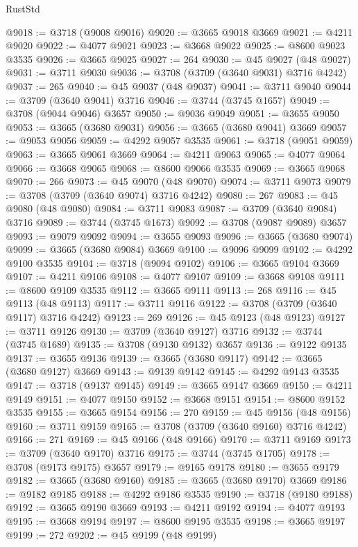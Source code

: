 \begin{lexlean}{RustStd}
\begin{coremodule}
@9018 := @3718 (@9008 @9016)
@9020 := @3665 @9018 @3669
@9021 := @4211 @9020
@9022 := @4077 @9021
@9023 := @3668 @9022
@9025 := @8600 @9023 @3535
@9026 := @3665 @9025
@9027 := 264
@9030 := @45 @9027 (@48 @9027)
@9031 := @3711 @9030
@9036 := @3708 (@3709 (@3640 @9031) @3716 @4242)
@9037 := 265
@9040 := @45 @9037 (@48 @9037)
@9041 := @3711 @9040
@9044 := @3709 (@3640 @9041) @3716
@9046 := @3744 (@3745 @1657)
@9049 := @3708 (@9044 @9046) @3657
@9050 := @9036 @9049
@9051 := @3655 @9050
@9053 := @3665 (@3680 @9031)
@9056 := @3665 (@3680 @9041) @3669
@9057 := @9053 @9056
@9059 := @4292 @9057 @3535
@9061 := @3718 (@9051 @9059)
@9063 := @3665 @9061 @3669
@9064 := @4211 @9063
@9065 := @4077 @9064
@9066 := @3668 @9065
@9068 := @8600 @9066 @3535
@9069 := @3665 @9068
@9070 := 266
@9073 := @45 @9070 (@48 @9070)
@9074 := @3711 @9073
@9079 := @3708 (@3709 (@3640 @9074) @3716 @4242)
@9080 := 267
@9083 := @45 @9080 (@48 @9080)
@9084 := @3711 @9083
@9087 := @3709 (@3640 @9084) @3716
@9089 := @3744 (@3745 @1673)
@9092 := @3708 (@9087 @9089) @3657
@9093 := @9079 @9092
@9094 := @3655 @9093
@9096 := @3665 (@3680 @9074)
@9099 := @3665 (@3680 @9084) @3669
@9100 := @9096 @9099
@9102 := @4292 @9100 @3535
@9104 := @3718 (@9094 @9102)
@9106 := @3665 @9104 @3669
@9107 := @4211 @9106
@9108 := @4077 @9107
@9109 := @3668 @9108
@9111 := @8600 @9109 @3535
@9112 := @3665 @9111
@9113 := 268
@9116 := @45 @9113 (@48 @9113)
@9117 := @3711 @9116
@9122 := @3708 (@3709 (@3640 @9117) @3716 @4242)
@9123 := 269
@9126 := @45 @9123 (@48 @9123)
@9127 := @3711 @9126
@9130 := @3709 (@3640 @9127) @3716
@9132 := @3744 (@3745 @1689)
@9135 := @3708 (@9130 @9132) @3657
@9136 := @9122 @9135
@9137 := @3655 @9136
@9139 := @3665 (@3680 @9117)
@9142 := @3665 (@3680 @9127) @3669
@9143 := @9139 @9142
@9145 := @4292 @9143 @3535
@9147 := @3718 (@9137 @9145)
@9149 := @3665 @9147 @3669
@9150 := @4211 @9149
@9151 := @4077 @9150
@9152 := @3668 @9151
@9154 := @8600 @9152 @3535
@9155 := @3665 @9154
@9156 := 270
@9159 := @45 @9156 (@48 @9156)
@9160 := @3711 @9159
@9165 := @3708 (@3709 (@3640 @9160) @3716 @4242)
@9166 := 271
@9169 := @45 @9166 (@48 @9166)
@9170 := @3711 @9169
@9173 := @3709 (@3640 @9170) @3716
@9175 := @3744 (@3745 @1705)
@9178 := @3708 (@9173 @9175) @3657
@9179 := @9165 @9178
@9180 := @3655 @9179
@9182 := @3665 (@3680 @9160)
@9185 := @3665 (@3680 @9170) @3669
@9186 := @9182 @9185
@9188 := @4292 @9186 @3535
@9190 := @3718 (@9180 @9188)
@9192 := @3665 @9190 @3669
@9193 := @4211 @9192
@9194 := @4077 @9193
@9195 := @3668 @9194
@9197 := @8600 @9195 @3535
@9198 := @3665 @9197
@9199 := 272
@9202 := @45 @9199 (@48 @9199)

\end{coremodule}
\end{lexlean}
